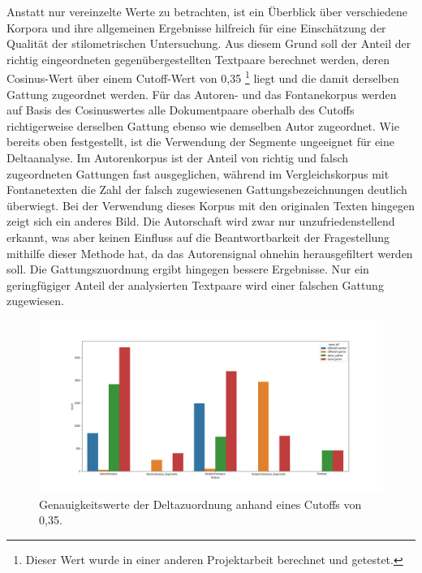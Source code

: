 \documentclass[a4paper,10p]{article}
\begin{document}
Anstatt nur vereinzelte Werte zu betrachten, ist ein Überblick über verschiedene Korpora und ihre allgemeinen Ergebnisse hilfreich für eine Einschätzung der Qualität der stilometrischen Untersuchung. Aus diesem Grund soll der Anteil der richtig eingeordneten gegenübergestellten Textpaare berechnet werden, deren Cosinus-Wert über einem Cutoff-Wert von 0,35 \footnote{Dieser Wert wurde in einer anderen Projektarbeit berechnet und getestet.} liegt und die damit derselben Gattung zugeordnet werden. Für das Autoren- und das Fontanekorpus werden auf Basis des Cosinuswertes alle Dokumentpaare oberhalb des Cutoffs richtigerweise derselben Gattung ebenso wie demselben Autor zugeordnet. Wie bereits oben festgestellt, ist die Verwendung der Segmente ungeeignet für eine Deltaanalyse. Im Autorenkorpus ist der Anteil von richtig und falsch zugeordneten Gattungen fast ausgeglichen, während im Vergleichskorpus mit Fontanetexten die Zahl der falsch zugewiesenen Gattungsbezeichnungen deutlich überwiegt. Bei der Verwendung dieses Korpus mit den originalen Texten hingegen zeigt sich ein anderes Bild. Die Autorschaft wird zwar nur unzufriedenstellend erkannt, was aber keinen Einfluss auf die Beantwortbarkeit der Fragestellung mithilfe dieser Methode hat, da das Autorensignal ohnehin herausgefiltert werden soll. Die Gattungszuordnung ergibt hingegen bessere Ergebnisse. Nur ein geringfügiger Anteil der analysierten Textpaare wird einer falschen Gattung zugewiesen. \par 

\begin{figure}
	\includegraphics[width=1\textwidth]{cutoffs_all.png}
	\caption{Genauigkeitswerte der Deltazuordnung anhand eines Cutoffs von 0,35.}
	\label{fig:deltacutoff}
\end{figure}
\end{document}
